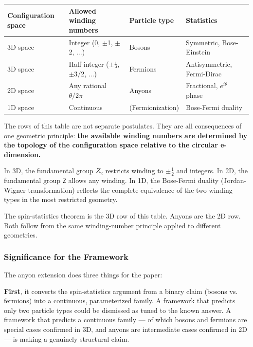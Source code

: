 \documentclass[aps,prd,preprint,superscriptaddress,longbibliography,floatfix]{revtex4-2}
\theoremstyle{remark}
\begin{document}
\begin{table}[H]
\begin{ruledtabular}
\begin{tabular}{p{3.8cm}p{3.8cm}p{3.8cm}p{3.8cm}}
Configuration space & Allowed winding numbers & Particle type & Statistics \\
\hline
3D space & Integer (0, $\pm$1, $\pm$2, ...) & Bosons & Symmetric, Bose-Einstein \\
3D space & Half-integer ($\pm$\texttt{½}, $\pm$3/2, ...) & Fermions & Antisymmetric, Fermi-Dirac \\
2D space & Any rational $\theta/2\pi$ & Anyons & Fractional, $e^{i\theta}$ phase \\
1D space & Continuous & (Fermionization) & Bose-Fermi duality \\
\end{tabular}
\end{ruledtabular}
\end{table}

The rows of this table are not separate postulates. They are all consequences of one geometric principle: \textbf{the available winding numbers are determined by the topology of the configuration space relative to the circular e-dimension.}

In 3D, the fundamental group $Z_{2}$ restricts winding to $\pm\tfrac{1}{2}$ and integers. In 2D, the fundamental group \texttt{Z} allows any winding. In 1D, the Bose-Fermi duality (Jordan-Wigner transformation) reflects the complete equivalence of the two winding types in the most restricted geometry.

The spin-statistics theorem is the 3D row of this table. Anyons are the 2D row. Both follow from the same winding-number principle applied to different geometries.


\subsubsection{Significance for the Framework}

The anyon extension does three things for the paper:

\textbf{First}, it converts the spin-statistics argument from a binary claim (bosons vs. fermions) into a continuous, parameterized family. A framework that predicts only two particle types could be dismissed as tuned to the known answer. A framework that predicts a continuous family --- of which bosons and fermions are special cases confirmed in 3D, and anyons are intermediate cases confirmed in 2D --- is making a genuinely structural claim.
\end{document}
